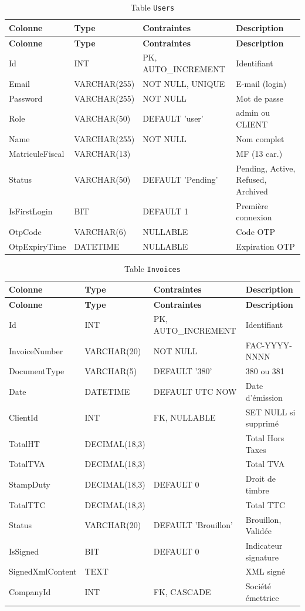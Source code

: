 \documentclass[a4paper,12pt]{report}
\begin{document}
\begin{longtable}{|l|l|l|p{5cm}|}
\caption{Table \texttt{Users}} \\
\hline \textbf{Colonne} & \textbf{Type} & \textbf{Contraintes} & \textbf{Description} \\ \hline
\endfirsthead \hline \textbf{Colonne} & \textbf{Type} & \textbf{Contraintes} & \textbf{Description} \\ \hline \endhead
Id & INT & PK, AUTO\_INCREMENT & Identifiant \\ \hline
Email & VARCHAR(255) & NOT NULL, UNIQUE & E-mail (login) \\ \hline
Password & VARCHAR(255) & NOT NULL & Mot de passe \\ \hline
Role & VARCHAR(50) & DEFAULT 'user' & admin ou CLIENT \\ \hline
Name & VARCHAR(255) & NOT NULL & Nom complet \\ \hline
MatriculeFiscal & VARCHAR(13) & & MF (13 car.) \\ \hline
Status & VARCHAR(50) & DEFAULT 'Pending' & Pending, Active, Refused, Archived \\ \hline
IsFirstLogin & BIT & DEFAULT 1 & Première connexion \\ \hline
OtpCode & VARCHAR(6) & NULLABLE & Code OTP \\ \hline
OtpExpiryTime & DATETIME & NULLABLE & Expiration OTP \\ \hline
\end{longtable}

\begin{longtable}{|l|l|l|p{5cm}|}
\caption{Table \texttt{Invoices}} \\
\hline \textbf{Colonne} & \textbf{Type} & \textbf{Contraintes} & \textbf{Description} \\ \hline
\endfirsthead \hline \textbf{Colonne} & \textbf{Type} & \textbf{Contraintes} & \textbf{Description} \\ \hline \endhead
Id & INT & PK, AUTO\_INCREMENT & Identifiant \\ \hline
InvoiceNumber & VARCHAR(20) & NOT NULL & FAC-YYYY-NNNN \\ \hline
DocumentType & VARCHAR(5) & DEFAULT '380' & 380 ou 381 \\ \hline
Date & DATETIME & DEFAULT UTC NOW & Date d'émission \\ \hline
ClientId & INT & FK, NULLABLE & SET NULL si supprimé \\ \hline
TotalHT & DECIMAL(18,3) & & Total Hors Taxes \\ \hline
TotalTVA & DECIMAL(18,3) & & Total TVA \\ \hline
StampDuty & DECIMAL(18,3) & DEFAULT 0 & Droit de timbre \\ \hline
TotalTTC & DECIMAL(18,3) & & Total TTC \\ \hline
Status & VARCHAR(20) & DEFAULT 'Brouillon' & Brouillon, Validée \\ \hline
IsSigned & BIT & DEFAULT 0 & Indicateur signature \\ \hline
SignedXmlContent & TEXT & & XML signé \\ \hline
CompanyId & INT & FK, CASCADE & Société émettrice \\ \hline
\end{longtable}
\end{document}
